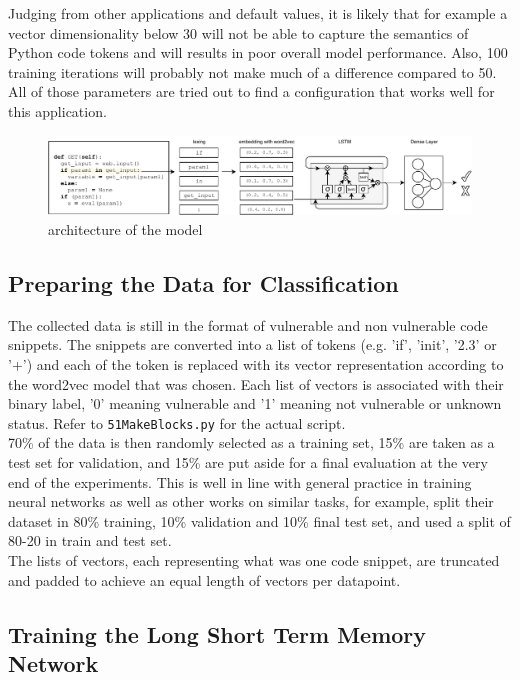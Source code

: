 \documentclass[
	a4paper,
	pagesize,
	pdftex,
	12pt,
	twoside, %
	BCOR=5mm, %
	ngerman,
	fleqn,
	final,
	]{scrartcl}
\begin{document}
Judging from other applications and default values, it is likely that for example a vector dimensionality below 30 will not be able to capture the semantics of Python code tokens and will results in poor overall model performance. Also, 100 training iterations will probably not make much of a difference compared to 50. All of those parameters are tried out to find a configuration that works well for this application.

\begin{figure}[ht]
	\centering
	\includegraphics[width=\linewidth]{img/Architecture}
	\caption{architecture of the model}
	\label{fig:architecture}
\end{figure}



\subsection{Preparing the Data for Classification}
The collected data is still in the format of vulnerable and non vulnerable code snippets. The snippets are converted into a list of tokens (e.g. 'if', 'init', '2.3' or '+') and each of the token is replaced with its vector representation according to the word2vec model that was chosen. Each list of vectors is associated with their binary label, '0' meaning vulnerable and '1' meaning not vulnerable or unknown status. Refer to \texttt{51MakeBlocks.py} for the actual script.\\
70\% of the data is then randomly selected as a training set, 15\% are taken as a test set for validation, and 15\% are put aside for a final evaluation at the very end of the experiments. This is well in line with general practice in training neural networks as well as other works on similar tasks, for example, \cite{Russell.2018} split their dataset in 80\% training, 10\% validation and 10\% final test set, and \cite{Li.2018} used a split of 80-20 in train and test set. \\
The lists of vectors, each representing what was one code snippet, are truncated and padded to achieve an equal length of vectors per datapoint.

\subsection{Training the Long Short Term Memory Network}
\end{document}
